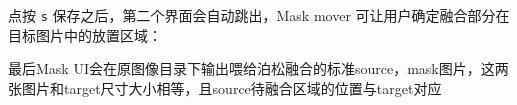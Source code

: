 \documentclass[a4paper]{article}
\begin{document}
点按 \texttt{s} 保存之后，第二个界面会自动跳出，Mask mover 可让用户确定融合部分在目标图片中的放置区域：

\begin{figure}[htpb]
  \centering 
\end{figure}

最后Mask UI会在原图像目录下输出喂给泊松融合的标准source，mask图片，这两张图片和target尺寸大小相等，且source待融合区域的位置与target对应
\end{document}
